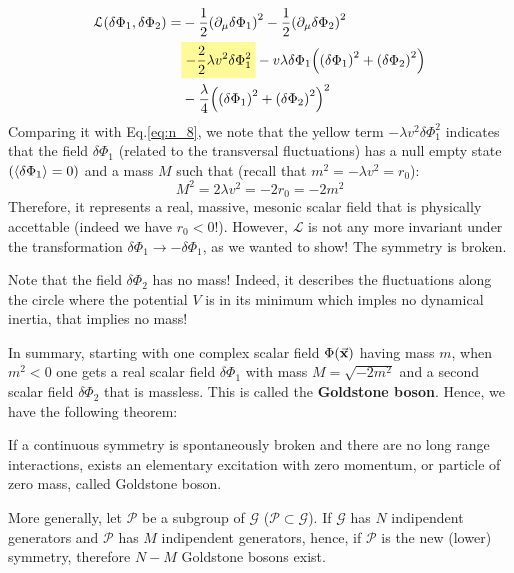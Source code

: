 \documentclass[../main/main.tex]{subfiles}
\begin{document}
\begin{equation}
\begin{split}
\mathcal{L} \qty(\delta \Phi _1, \delta \Phi _2)   = &  - \frac{1}{2} \qty(\partial_ \mu  \delta \Phi _1 )^2 - \frac{1}{2} \qty(\partial_ \mu \delta \Phi _2 )^2   \\
& \mathcolorbox{yellow!40}{- \frac{2}{2} \lambda v^2 \delta \Phi _1^2} - v \lambda \delta \Phi _1 \qty( \qty(\delta \Phi _1)^2 + \qty(\delta \Phi _2 )^2  ) \\
& - \frac{\lambda }{4} \qty( \qty(\delta \Phi _1)^2 + \qty(\delta \Phi _2)^2  )^2
\end{split}
\end{equation}
Comparing it with Eq.\eqref{eq:n_8}, we note that the yellow term \( - \lambda v^2 \delta \Phi _1^2 \) indicates that the field \( \delta \Phi _1 \) (related to the transversal fluctuations) has a null empty state \( ( \expval{\delta \Phi _1}= 0 ) \) and a mass \( M \) such that (recall that \( m^2 = - \lambda v^2 = r_0 \)):
\begin{equation*}
  M^2 = 2 \lambda v^2 =  -2 r_0 = - 2m^2
\end{equation*}
Therefore, it represents a real, massive, mesonic scalar field that is physically accettable (indeed we have \( r_0<0 \)!).
However, \( \mathcal{L} \) is not any more invariant under the transformation \( \delta \Phi _1 \rightarrow - \delta \Phi _1 \), as we wanted to show! The symmetry is broken.


\begin{remark}
  Note that the field \( \delta \Phi _2 \) has no mass! Indeed, it describes the fluctuations along the circle where the potential \( V \) is in its minimum  which imples no dynamical inertia, that implies no mass!
\end{remark}

In summary, starting with one complex scalar field \( \Phi (\va{x}) \) having mass \( m \), when \( m^2 < 0 \) one gets a real scalar field \( \delta \Phi _1 \) with mass \( M = \sqrt{- 2 m^2}  \)  and a second scalar field \( \delta \Phi _2 \) that is massless. This is called the \textbf{Goldstone boson}. Hence, we have the following theorem:

\begin{theorem}{}{}
If a continuous symmetry is spontaneously broken and there are no long range interactions, exists an elementary excitation with zero momentum, or particle of zero mass, called Goldstone boson.

More generally, let \( \mathcal{P} \) be a subgroup of \( \mathcal{G} \) (\( \mathcal{P} \subset \mathcal{G} \)). If \( \mathcal{G} \) has \( N \) indipendent generators and \( \mathcal{P} \)  has \( M \) indipendent generators, hence, if \( \mathcal{P} \) is the new (lower) symmetry, therefore \( N-M \)  Goldstone bosons exist.
\end{theorem}
\end{document}
